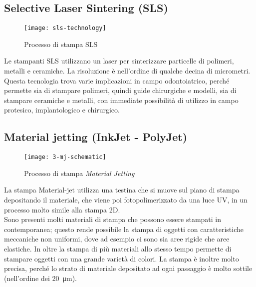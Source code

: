 \subsection{Selective Laser Sintering (SLS)}
\begin{wrapfigure} {R} {0.40\textwidth}
\vspace{-30pt}
	\begin{center}
	\texttt{[image: sls-technology]}
    \caption{Processo di stampa SLS}
    \label{fig:sls-technology}
    \end{center}
\vspace{-40pt}
\end{wrapfigure}
Le stampanti SLS utilizzano un laser per sinterizzare particelle di polimeri, metalli e ceramiche. La risoluzione è nell'ordine di qualche decina di micrometri. Questa tecnologia trova varie implicazioni in campo odontoiatrico, perché permette sia di stampare polimeri, quindi guide chirurgiche e modelli, sia di stampare ceramiche e metalli, con immediate possibilità di utilizzo in campo protesico, implantologico e chirurgico.

\subsection{Material jetting (InkJet - PolyJet)}
\begin{wrapfigure} {R} {0.5\textwidth}
\vspace{-20pt}
	\begin{center}
	\texttt{[image: 3-mj-schematic]}
    \caption{Processo di stampa \emph{Material Jetting}}
    \label{fig:3-mj-schematic}
    \end{center}
\vspace{-20pt}
\end{wrapfigure}
La stampa Material-jet  utilizza una testina che si muove sul piano di stampa depositando il materiale, che viene poi fotopolimerizzato da una luce UV, in un processo molto simile alla stampa 2D.\\
Sono presenti molti materiali di stampa che possono essere stampati in contemporanea; questo rende possibile la stampa di oggetti con caratteristiche meccaniche non uniformi, dove ad esempio ci sono sia aree rigide che aree elastiche. In oltre la stampa di più materiali allo stesso tempo permette di stampare oggetti con una grande varietà di colori. La stampa è inoltre molto precisa, perché lo strato di materiale depositato ad ogni passaggio è molto sottile (nell'ordine dei \SI {20}{\micro\metre}).


